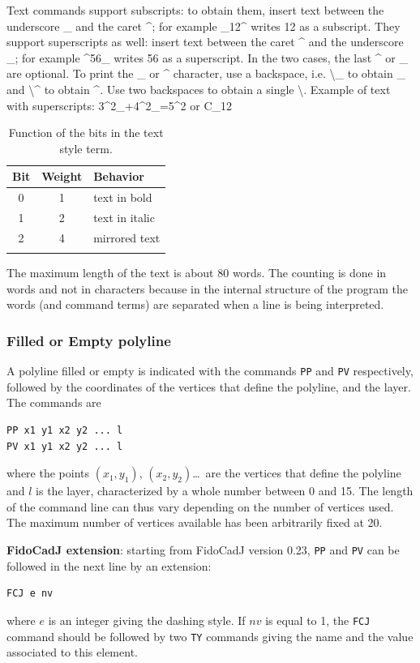 \documentclass[10pt,a4paper,twoside]{scrreprt}
\newcommand{\toprule}{\hline}
\newcommand{\midrule}{\hline}
\newcommand{\bottomrule}{\hline}
\begin{document}
Text commands support subscripts: to obtain them, insert text between the underscore \_ and the caret \^{}; for example \_12\^{} writes 12 as a subscript. They support superscripts as well: insert text between the caret \^{} and the underscore \_; for example \^{}56\_ writes 56 as a superscript. In the two cases, the last \^{} or \_ are optional. To print the \_ or \^{} character, use a backspace, i.e. \textbackslash \_ to obtain \_ and \textbackslash \^{} to obtain \^{}. Use two backspaces to obtain a single \textbackslash. Example of text with superscripts: 3\^{}2\_+4\^{}2\_=5\^{}2 or C\_12


\begin{table}
\centering \begin{tabular}{ccp{}}
\toprule Bit  & Weight  & Behavior \tabularnewline
\midrule 0  & 1  & text in bold\tabularnewline
1  & 2  & text in italic\tabularnewline
2  & 4  & mirrored text\tabularnewline
\bottomrule  &  & \tabularnewline
\end{tabular}
\caption{Function of the bits in the text style term.}
\label{tab_stile_testo}
\end{table}

The maximum length of the text is about
80 words. The counting is done in words and not in characters because
in the internal structure of the program the words (and command terms)
are separated when a line is being interpreted.

\subsubsection{Filled or Empty polyline}
A polyline filled or empty is indicated with the
commands \lstinline!PP! and \lstinline!PV!
respectively, followed by the coordinates of the vertices that define
the polyline, and the layer. The commands are
\begin{lstlisting}
PP x1 y1 x2 y2 ... l
PV x1 y1 x2 y2 ... l
\end{lstlisting}
where the points $(x_{1},y_{1})$, $(x_{2},y_{2})$\dots\ are the vertices
that define the polyline and $l$ is the layer, characterized by a
whole number between 0 and 15. The length of the command line can
thus vary depending on the number of vertices used. The maximum number
of vertices available has been
arbitrarily fixed at 20.

\textbf{FidoCadJ extension}: starting from FidoCadJ version 0.23,  \lstinline!PP! and \lstinline!PV! can be followed in the next line by an extension:
\begin{lstlisting}
FCJ e nv
\end{lstlisting}
where $e$ is an integer giving the dashing style. If $nv$ is equal to 1, the \lstinline!FCJ! command should be followed by two \lstinline!TY! commands giving the name and the value associated to this element.
\end{document}
